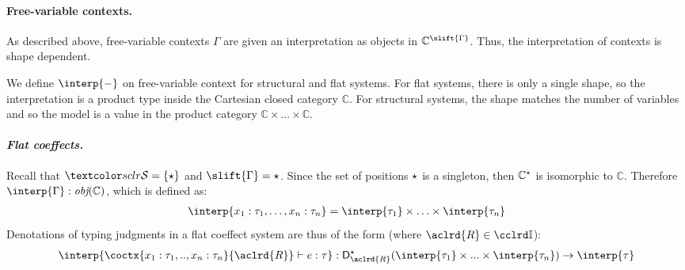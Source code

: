 %
%

\paragraph{Free-variable contexts.} 
As described above, free-variable contexts $\Gamma$ are given an
interpretation as objects in $\mathbb{C}^{\slift{\Gamma}}$. Thus,
the interpretation of contexts is shape dependent. 

We define $\interp{-}$ on free-variable context for structural and flat
systems. For flat systems, there is only a single shape, so the interpretation
is a product type inside the Cartesian closed category $\mathbb{C}$. For 
structural systems, the shape matches the number of variables and so the model 
is a value in the product category $\mathbb{C} \times \ldots \times \mathbb{C}$.

\paragraph{\textnormal{\emph{Flat coeffects.}}} 
Recall that $\SH = \{\sflat\}$ and $\slift{\Gamma} = \sflat$.
Since the set of positions $\star$ is a singleton, then $\mathbb{C}^{\star}$
is isomorphic to $\mathbb{C}$.
%
%
%
Therefore $\interp{\Gamma} : \emph{obj}(\mathbb{C})$, which is defined as:
%
%
\begin{align*}
\interp{x_1 : \tau_1, \ldots, x_n : \tau_n} = \interp{\tau_1} \times \ldots \times \interp{\tau_n}
\end{align*}
%
Denotations of typing judgments in a flat coeffect system are thus of the form 
(where $\aclrd{R} \in \Icat$): 
$$\interp{\coctx{x_1 : \tau_1, .., 
x_n : \tau_n}{\aclrd{R}} \vdash e : \tau} : \D^{\sflat}_{\aclrd{R}}(\interp{\tau_1} \times ... \times \interp{\tau_n})
\rightarrow \interp{\tau}
$$


